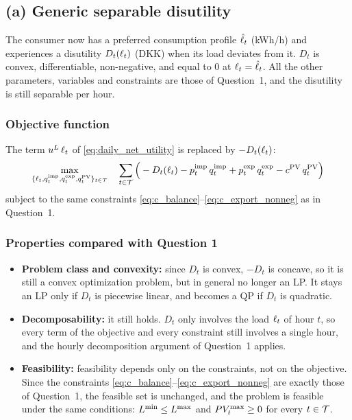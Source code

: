\subsection{(a) Generic separable disutility}

The consumer now has a preferred
consumption profile $\hat{\ell}_{t}$ (kWh/h) and experiences a disutility $D_t(\ell_{t})$ (DKK) when its
load deviates from it. $D_t$ is convex, differentiable, non-negative, and equal to $0$ at
$\ell_{t} = \hat{\ell}_{t}$. All the other parameters, variables and constraints are those of
Question~1, and the disutility is still separable per hour.

\subsubsection{Objective function}
The term $u^{L} \, \ell_{t}$ of \eqref{eq:daily_net_utility} is replaced by $-D_t(\ell_{t})$:
\begin{equation}
    \max_{\{\ell_{t}, q^{\mathrm{imp}}_{t}, q^{\mathrm{exp}}_{t}, q^{\mathrm{PV}}_{t}\}_{t \in \mathcal{T}}} \quad
    \sum_{t \in \mathcal{T}} \Big( - D_t(\ell_{t}) - p^{\mathrm{imp}}_{t} \, q^{\mathrm{imp}}_{t} + p^{\mathrm{exp}}_{t} \, q^{\mathrm{exp}}_{t} - c^{\mathrm{PV}} \, q^{\mathrm{PV}}_{t} \Big)
    \label{eq:q2_objective}
\end{equation}
subject to the same constraints \eqref{eq:c_balance}--\eqref{eq:c_export_nonneg} as in Question~1.

\subsubsection{Properties compared with Question 1}
\begin{itemize}
    \item \textbf{Problem class and convexity:} since $D_t$ is convex, $-D_t$ is concave, so it is still a convex optimization problem, but in general no longer an LP. It
    stays an LP only if $D_t$ is piecewise linear, and becomes a QP if $D_t$ is quadratic.
    \item \textbf{Decomposability:} it still holds. $D_t$ only involves the load $\ell_{t}$ of
    hour $t$, so every term of the objective and every constraint still involves a single
    hour, and the hourly decomposition argument of Question~1 applies.
    \item \textbf{Feasibility:} feasibility depends only on the constraints, not on the
    objective. Since the constraints \eqref{eq:c_balance}--\eqref{eq:c_export_nonneg} are
    exactly those of Question~1, the feasible set is unchanged, and the problem is feasible
    under the same conditions: $L^{\min} \leq L^{\max}$ and $PV_{t}^{\max} \geq 0$
    for every $t \in \mathcal{T}$.
\end{itemize}

